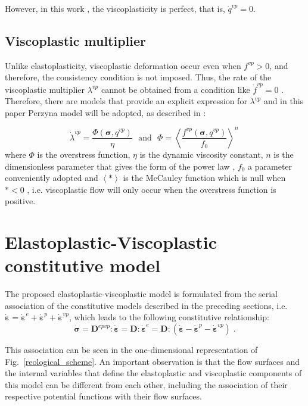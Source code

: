 \documentclass[Journal,letterpaper]{ascelike-new}
\newcommand{\Dsdee}{\boldsymbol{D}}
\newcommand{\Dsdepev}{\boldsymbol{D}^{epvp}}
\newcommand{\dstrain}{\boldsymbol{\dot{\varepsilon}}}
\newcommand{\dstraine}{\boldsymbol{\dot{\varepsilon}}^{e}}
\newcommand{\dstrainp}{\boldsymbol{\dot{\varepsilon}}^{p}}
\newcommand{\dstrainv}{\boldsymbol{\dot{\varepsilon}}^{vp}}
\newcommand{\dstress}{\boldsymbol{\dot{\sigma}}}
\newcommand{\stress}{\boldsymbol{\sigma}}
\begin{document}
However, in this work , the viscoplasticity is perfect, that is, $\dot q^{vp} = 0$.

\subsection{Viscoplastic multiplier}

Unlike elastoplasticity, viscoplastic deformation occur even when $f^{vp} > 0$, and therefore, the consistency condition is not imposed. Thus, the rate of the viscoplastic multiplier $\lambda^{vp}$ cannot be obtained from a condition like $\dot f^{vp} = 0$ . Therefore, there are models that provide an explicit expression for $\lambda^{vp}$ and in this paper Perzyna model \cite{perzyna1966} will be adopted, as described in :

\begin{equation} \label{eq_perzyna_model}
	\dot \lambda^{vp} = \dfrac{\Phi(\stress,q^{vp})}{\eta}~~~\text{and}~~~\Phi = \left\langle  \dfrac{f^{vp}(\stress,q^{vp})}{f_0} \right\rangle^n \,
\end{equation} where $\Phi$ is the overstress function, $\eta$ is the dynamic viscosity constant, $n$ is the dimensionless parameter that gives the form of the power law , $f_0$ a parameter conveniently adopted and $\left\langle * \right\rangle$ is the McCauley function which is null when $* <0$ , i.e. viscoplastic flow will only occur when the overstress function is positive.

\section{Elastoplastic-Viscoplastic constitutive model}

The proposed elastoplastic-viscoplastic model is formulated from the serial association of the constitutive models described in the preceding sections, i.e. $\dstrain = \dstraine + \dstrainp + \dstrainv$, which leads to the following constitutive relationship:
\begin{equation} \label{eq_constitutive_relationship_epvp}
	\dstress = \Dsdepev : \dstrain = \Dsdee : \dstraine = \Dsdee : (\dstrain - \dstrainp - \dstrainv)\;.
\end{equation}

This association can be seen in the one-dimensional representation of Fig.~\ref{reological_scheme}. An important observation is that the flow surfaces and the internal variables that define the elastoplastic and viscoplastic components of this model can be different from each other, including the association of their respective potential functions with their flow surfaces.
\end{document}
